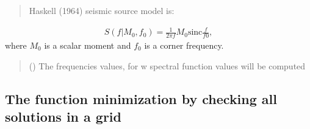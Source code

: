 \documentclass[letterpaper,10pt,english]{sphinxmanual}
\begin{document}

\begin{fulllineitems}
\label{\detokenize{api_support:amw.mw.source_models.HaskellSourceModel}}
\pysigstartsignatures
{}
\pysigstopsignatures\begin{quote}

\sphinxAtStartPar
Haskell (1964) seismic source model is:
\end{quote}
\begin{equation*}
\begin{split}S\left(f|M_0,f_0\right)=\frac{1}{2\pi f}M_0\text{sinc}\frac{f}{f0},\end{split}
\end{equation*}
\sphinxAtStartPar
where \(M_0\) is a scalar moment and \(f_0\) is a corner frequency.
\begin{quote}\begin{description}
\sphinxAtStartPar
{} () \textendash{} The frequencies values, for w spectral function values will be computed

\end{description}\end{quote}

\end{fulllineitems}


\subsection{The function minimization by checking all solutions in a grid}
\label{\detokenize{api_support:the-function-minimization-by-checking-all-solutions-in-a-grid}}\label{\detokenize{api_support:module-amw.mw.MinimizeInGrid}}
\end{document}
